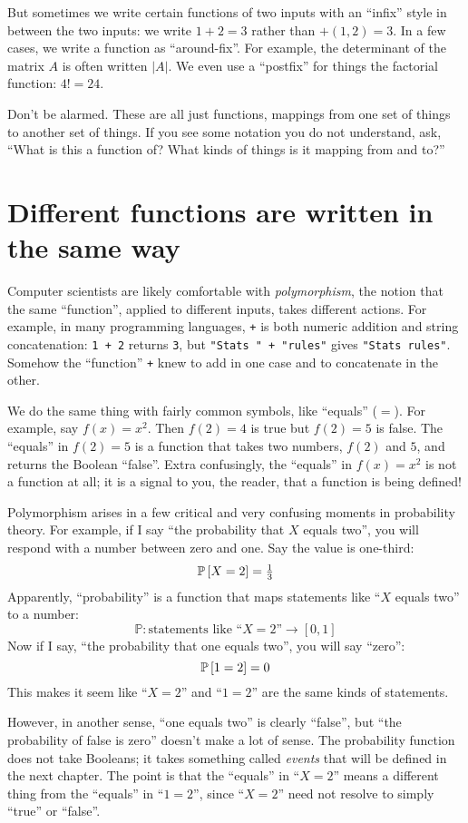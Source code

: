 But sometimes we write certain functions of two inputs with an ``infix'' style
in between the two inputs: we write $1 + 2 = 3$ rather than $\mathord{+}(1, 2)
= 3$. In a few cases, we write a function as ``around-fix''. For example, the
determinant of the matrix $A$ is often written $|A|$. We even use a ``postfix''
for things the factorial function: $4! = 24$.

Don't be alarmed. These are all just functions, mappings from one set of things
to another set of things. If you see some notation you do not understand, ask,
``What is this a function of? What kinds of things is it mapping from and to?''


\section{Different functions are written in the same way}

Computer scientists are likely comfortable with \emph{polymorphism}, the
notion that the same ``function'', applied to different inputs, takes different
actions. For example, in many programming languages, \texttt{+} is both
numeric addition and string concatenation: \texttt{1 + 2} returns \texttt{3},
but \texttt{"Stats " + "rules"} gives \texttt{"Stats rules"}. Somehow the
``function'' \texttt{+} knew to add in one case and to concatenate in the
other.

We do the same thing with fairly common symbols, like ``equals'' ($=$). For
example, say $f(x) = x^2$. Then $f(2) = 4$ is true but $f(2) = 5$ is false.
The ``equals'' in $f(2) = 5$ is a function that takes two numbers, $f(2)$ and
$5$, and returns the Boolean ``false''. Extra confusingly, the ``equals'' in
$f(x) = x^2$ is not a function at all; it is a signal to you, the reader, that
a function is being defined!

Polymorphism arises in a few critical and very confusing moments in probability
theory. For example, if I say ``the probability that $X$ equals two'', you will
respond with a number between zero and one. Say the value is one-third:
\begin{equation*}
\mathbb{P}\left[{X = 2}\right] = \tfrac{1}{3}
\end{equation*}
Apparently, ``probability'' is a function that maps statements like
``$X$ equals two'' to a number:
\begin{equation*}
\mathbb{P} : \text{statements like ``$X=2$''} \to [0, 1]
\end{equation*}
Now if I say, ``the probability that one equals two'', you will say ``zero'':
\begin{equation*}
\mathbb{P}\left[{1 = 2}\right] = 0
\end{equation*}
This makes it seem like ``$X=2$'' and ``$1=2$'' are the same
kinds of statements.

However, in another sense, ``one equals two'' is clearly ``false'', but
``the probability of false is zero'' doesn't make a lot of sense. The probability
function does not take Booleans; it takes something called \emph{events} that
will be defined in the next chapter. The point is that the ``equals'' in ``$X=2$''
means a different thing from the ``equals'' in ``$1=2$'', since ``$X=2$'' need
not resolve to simply ``true'' or ``false''.
